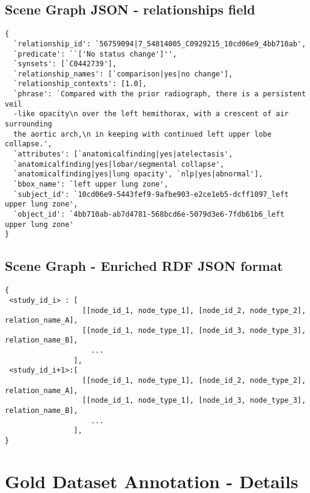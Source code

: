 \subsection{Scene Graph JSON - relationships field}\label{json4}
\begin{footnotesize}
\begin{verbatim}
{
  `relationship_id': `56759094|7_54814005_C0929215_10cd06e9_4bb710ab',
  `predicate': ``['No status change']'',
  `synsets': [`C0442739'],
  `relationship_names': [`comparison|yes|no change'],
  `relationship_contexts': [1.0],
  `phrase': `Compared with the prior radiograph, there is a persistent veil 
  -like opacity\n over the left hemithorax, with a crescent of air surrounding 
  the aortic arch,\n in keeping with continued left upper lobe collapse.',
  `attributes': [`anatomicalfinding|yes|atelectasis',
  `anatomicalfinding|yes|lobar/segmental collapse',
  `anatomicalfinding|yes|lung opacity', `nlp|yes|abnormal'],
  `bbox_name': `left upper lung zone',
  `subject_id': `10cd06e9-5443fef9-9afbe903-e2ce1eb5-dcff1097_left upper lung zone',
  `object_id': `4bb710ab-ab7d4781-568bcd6e-5079d3e6-7fdb61b6_left upper lung zone'
}
\end{verbatim}
\end{footnotesize}


\subsection{Scene Graph - Enriched RDF JSON format}
\begin{footnotesize}\label{json5}
\begin{verbatim}
{
 <study_id_i> : [
                  [[node_id_1, node_type_1], [node_id_2, node_type_2], relation_name_A],
                  [[node_id_1, node_type_1], [node_id_3, node_type_3], relation_name_B],
                    ...
                ],
 <study_id_i+1>:[
                  [[node_id_1, node_type_1], [node_id_2, node_type_2], relation_name_A],
                  [[node_id_1, node_type_1], [node_id_3, node_type_3], relation_name_B],
                    ...
                ],
}   
\end{verbatim}
\end{footnotesize}


\section{Gold Dataset Annotation - Details}
\label{gold_annot_supp}

